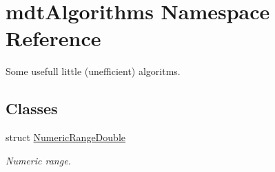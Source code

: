 \hypertarget{namespacemdt_algorithms}{\section{mdt\-Algorithms Namespace Reference}
\label{namespacemdt_algorithms}
}


Some usefull little (unefficient) algoritms.  


\subsection*{Classes}
\begin{DoxyCompactItemize}
\item 
struct \hyperlink{structmdt_algorithms_1_1_numeric_range_double}{Numeric\-Range\-Double}
\begin{DoxyCompactList}\small\item\em Numeric range. \end{DoxyCompactList}\end{DoxyCompactItemize}

